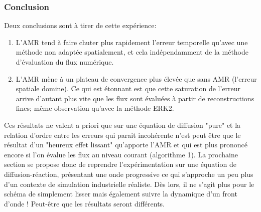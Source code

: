     \subsubsection{Conclusion}
    Deux conclusions sont à tirer de cette expérience:
    \begin{enumerate}
        \item L'AMR tend à faire chuter plus rapidement l'erreur temporelle qu'avec une méthode non adaptée spatialement, et cela indépendamment de la méthode d'évaluation du flux numérique.
        \item L'AMR mène à un plateau de convergence plus élevée que sans AMR (l'erreur spatiale domine). Ce qui est étonnant est que cette saturation de l'erreur arrive d'autant plus vite que les flux sont évaluées à partir de reconstructions fines; même observation qu'avec la méthode ERK2.
    \end{enumerate}
    Ces résultats ne valent a priori que sur une équation de diffusion "pure" et la relation d'ordre entre les erreurs qui parait incohérente n'est peut être que le résultat d'un 
    "heureux effet lissant" qu'apporte l'AMR et qui est plus prononcé encore si l'on évalue les flux au niveau courant (algorithme 1).
    La prochaine section se propose donc de reprendre l'expérimentation sur une équation de diffusion-réaction, présentant une onde progressive ce qui s'approche un peu plus
    d'un contexte de simulation industrielle réaliste.
    Dès lors, il ne s'agit plus pour le schéma de simplement lisser mais également suivre la dynamique d'un front d'onde ! Peut-être que les résultats seront différents.